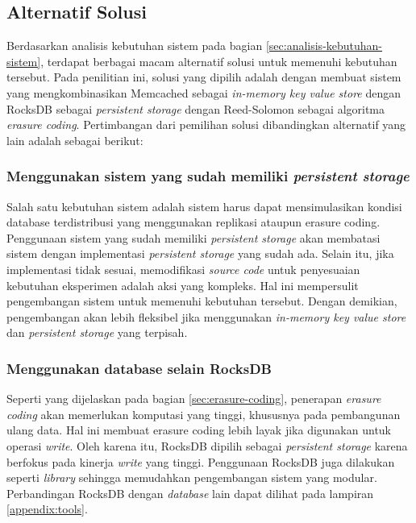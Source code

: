 \subsection{Alternatif Solusi}
\label{sec:alternatif-solusi}

Berdasarkan analisis kebutuhan sistem pada bagian \ref{sec:analisis-kebutuhan-sistem}, terdapat berbagai macam alternatif solusi untuk memenuhi kebutuhan tersebut. Pada penilitian ini, solusi yang dipilih adalah dengan membuat sistem yang mengkombinasikan Memcached sebagai \textit{in-memory key value store} dengan RocksDB sebagai \textit{persistent storage} dengan Reed-Solomon sebagai algoritma \textit{erasure coding}. Pertimbangan dari pemilihan solusi dibandingkan alternatif yang lain adalah sebagai berikut:

\subsubsection{Menggunakan sistem yang sudah memiliki \textit{persistent storage}}
Salah satu kebutuhan sistem adalah sistem harus dapat mensimulasikan kondisi database terdistribusi yang menggunakan replikasi ataupun erasure coding. Penggunaan sistem yang sudah memiliki \textit{persistent storage} akan membatasi sistem dengan implementasi \textit{persistent storage} yang sudah ada. Selain itu, jika implementasi tidak sesuai, memodifikasi \textit{source code} untuk penyesuaian kebutuhan eksperimen adalah aksi yang kompleks. Hal ini mempersulit pengembangan sistem untuk memenuhi kebutuhan tersebut. Dengan demikian, pengembangan akan lebih fleksibel jika menggunakan \textit{in-memory key value store} dan \textit{persistent storage} yang terpisah.

\subsubsection{Menggunakan database selain RocksDB}
Seperti yang dijelaskan pada bagian \ref{sec:erasure-coding}, penerapan \textit{erasure coding} akan memerlukan komputasi yang tinggi, khususnya pada pembangunan ulang data. Hal ini membuat erasure coding lebih layak jika digunakan untuk operasi \textit{write}. Oleh karena itu, RocksDB dipilih sebagai \textit{persistent storage} karena berfokus pada kinerja \textit{write} yang tinggi. Penggunaan RocksDB juga dilakukan seperti \textit{library} sehingga memudahkan pengembangan sistem yang modular. Perbandingan RocksDB dengan \textit{database} lain dapat dilihat pada lampiran \ref{appendix:tools}. 

